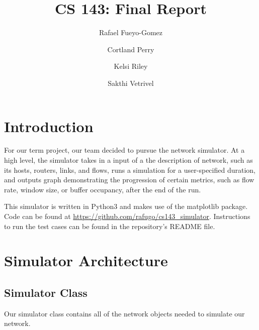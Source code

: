 \documentclass{article}
\begin{document}
%
\title{CS 143: Final Report}

\author{{Rafael Fueyo-Gomez}
\and
{Cortland Perry}
\and
{Kelsi Riley}
\and
{Sakthi Vetrivel}}
\maketitle
\section{Introduction}

For our term project, our team decided to pursue the network simulator. At a high level, the simulator takes in a input of a the description of network, such as its hosts, routers, links, and flows, runs a simulation for a user-specified duration, and outputs graph demonstrating the progression of certain metrics, such as flow rate, window size, or buffer occupancy, after the end of the run. 

This simulator is written in Python3 and makes use of the matplotlib package. Code can be found at \url{https://github.com/rafugo/cs143_simulator}. Instructions to run the test cases can be found in the repository's README file.

\section{Simulator Architecture}

\subsection{Simulator Class}

Our simulator class contains all of the network objects needed to simulate our network. 
\end{document}

